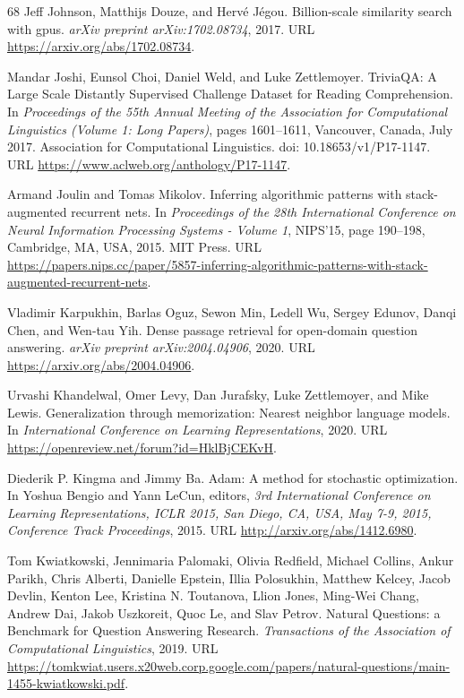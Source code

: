 \documentclass[10pt,letterpaper]{article}
\begin{document}
{\begin{thebibliography}{68}
 Jeff Johnson, Matthijs Douze, and Hervé Jégou. Billion-scale
similarity search with gpus. \emph{arXiv preprint arXiv:1702.08734}, 2017. URL
\url{https://arxiv.org/abs/1702.08734}.

 Mandar Joshi, Eunsol Choi, Daniel Weld, and Luke Zettlemoyer.
TriviaQA: A Large Scale Distantly Supervised Challenge Dataset for Reading
Comprehension. In \emph{Proceedings of the 55th Annual Meeting of the
Association for Computational Linguistics (Volume 1: Long Papers)}, pages
1601--1611, Vancouver, Canada, July 2017. Association for Computational
Linguistics. doi: 10.18653/v1/P17-1147. URL
\url{https://www.aclweb.org/anthology/P17-1147}.

 Armand Joulin and Tomas Mikolov. Inferring algorithmic patterns
with stack-augmented recurrent nets. In \emph{Proceedings of the 28th
International Conference on Neural Information Processing Systems - Volume 1},
NIPS'15, page 190--198, Cambridge, MA, USA, 2015. MIT Press. URL
\url{https://papers.nips.cc/paper/5857-inferring-algorithmic-patterns-with-stack-augmented-recurrent-nets}.

 Vladimir Karpukhin, Barlas Oguz, Sewon Min, Ledell Wu, Sergey
Edunov, Danqi Chen, and Wen-tau Yih. Dense passage retrieval for open-domain
question answering. \emph{arXiv preprint arXiv:2004.04906}, 2020. URL
\url{https://arxiv.org/abs/2004.04906}.

 Urvashi Khandelwal, Omer Levy, Dan Jurafsky, Luke Zettlemoyer,
and Mike Lewis. Generalization through memorization: Nearest neighbor language
models. In \emph{International Conference on Learning Representations}, 2020.
URL \url{https://openreview.net/forum?id=HklBjCEKvH}.

 Diederik P. Kingma and Jimmy Ba. Adam: A method for stochastic
optimization. In Yoshua Bengio and Yann LeCun, editors, \emph{3rd International
Conference on Learning Representations, ICLR 2015, San Diego, CA, USA, May 7-9,
2015, Conference Track Proceedings}, 2015. URL
\url{http://arxiv.org/abs/1412.6980}.

 Tom Kwiatkowski, Jennimaria Palomaki, Olivia Redfield, Michael
Collins, Ankur Parikh, Chris Alberti, Danielle Epstein, Illia Polosukhin,
Matthew Kelcey, Jacob Devlin, Kenton Lee, Kristina N. Toutanova, Llion Jones,
Ming-Wei Chang, Andrew Dai, Jakob Uszkoreit, Quoc Le, and Slav Petrov. Natural
Questions: a Benchmark for Question Answering Research. \emph{Transactions of
the Association of Computational Linguistics}, 2019. URL
\url{https://tomkwiat.users.x20web.corp.google.com/papers/natural-questions/main-1455-kwiatkowski.pdf}.


\end{thebibliography}}
\end{document}
